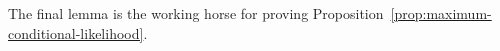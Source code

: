 % 
% 

The final lemma is the working horse for proving Proposition~\ref{prop:maximum-conditional-likelihood}. 


